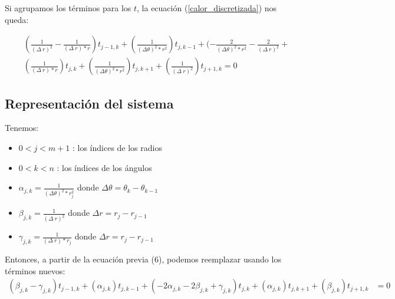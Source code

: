 Si agrupamos los términos para los $t$, la ecuación (\ref{calor_discretizada}) nos queda:

\begin{equation}
   \begin{aligned}
    &(\frac{1}{(\Delta\ r)^2} - \frac{1}{(\Delta\ r) * r})t_{j-1,k} + (\frac{1}{(\Delta\theta)^2 * r^2})t_{j,k-1} +  (-\frac{2}{(\Delta\theta)^2 * r^2}-\frac{2}{(\Delta\ r)^2} +\\
    &(\frac{1} {(\Delta\ r) * r})t_{j,k} + (\frac{1}{(\Delta\theta)^2 * r^2})t_{j,k+1} + (\frac{1}{(\Delta\ r)^2})t_{j+1,k} = 0
    \end{aligned}
\end{equation}

\subsection{Representación del sistema}

Tenemos:
\begin{itemize}
    \item $0 < j < m+1$ : los índices de los radios
    \item $0 < k < n$ : los índices de los ángulos
    \item $\alpha_{j,k} = \frac{1}{(\Delta\theta)^2 * r_{j}^2}$ donde $\Delta\theta = \theta_{k}-\theta_{k-1}$
    \item $\beta_{j,k} = \frac{1}{(\Delta\ r)^2}$ donde $\Delta r = r_{j}-r_{j-1}$
    \item $\gamma_{j,k} = \frac{1}{(\Delta\ r) * r_j}$ donde $\Delta r = r_{j}-r_{j-1}$
\end{itemize}

Entonces, a partir de la ecuación previa (6), podemos reemplazar usando los términos nuevos:
\begin{equation}
   \begin{aligned}
      (\beta_{j,k} - \gamma_{j,k})t_{j-1,k} +
      (\alpha_{j,k})t_{j,k-1} +
      (-2\alpha_{j,k}-2\beta_{j,k}+\gamma_{j,k})t_{j,k} +
      (\alpha_{j,k})t_{j,k+1} +
      (\beta_{j,k})t_{j+1,k} &= 0\\
    \end{aligned}
\end{equation}

